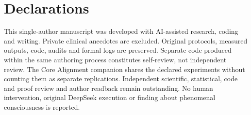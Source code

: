 \documentclass[11pt,letterpaper]{article}
\begin{document}
\section*{Declarations}

This single-author manuscript was developed with AI-assisted research, coding and writing. Private clinical anecdotes are excluded. Original protocols, measured outputs, code, audits and formal logs are preserved. Separate code produced within the same authoring process constitutes self-review, not independent review. The Core Alignment companion shares the declared experiments without counting them as separate replications. Independent scientific, statistical, code and proof review and author readback remain outstanding. No human intervention, original DeepSeek execution or finding about phenomenal consciousness is reported.
\end{document}
